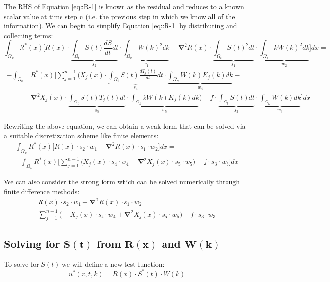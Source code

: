\documentclass{article}
\def\ds{\displaystyle}
\def\grad{\mathbf\nabla}
\begin{document}
The RHS of Equation \ref{eq::R-1} is known as the residual and reduces to a known scalar value at time step $n$ (i.e. the previous step in which we know all of the information). We can begin to simplify Equation \ref{eq::R-1} by distributing and collecting terms:
\begin{equation*}
\ds\int_{\Omega_x} R^*(x) \Bigg[ R(x)\cdot \underbrace{\ds\int_{\Omega_t} S(t)\frac{dS}{dt}dt}_{s_2} \cdot \underbrace{\ds\int_{\Omega_k} W(k)^2 dk}_{w_1} - \grad^2 R(x) \cdot \underbrace{\ds\int_{\Omega_t} S(t)^2 dt}_{s_1} \cdot \underbrace{\ds\int_{\Omega_k} kW(k)^2 dk}_{w_2} \Bigg] dx =
\end{equation*}\vspace{-15pt}
\begin{align}
-\ds\int_{\Omega_x}& R^*(x) \Bigg[ \ds\sum_{j=1}^{n-1} \bigg(X_j(x) \cdot \underbrace{\ds\int_{\Omega_t} S(t)\frac{dT_j(t)}{dt} dt}_{s_4} \cdot \underbrace{\ds\int_{\Omega_k}W(k)K_j(k) dk}_{w_4} - \nonumber \\
& \grad^2X_j(x) \cdot \underbrace{\ds\int_{\Omega_t}S(t)T_j(t) dt}_{s_5} \cdot \underbrace{\ds\int_{\Omega_k}kW(k)K_j(k)dk}_{w_5} \bigg) - f \cdot \underbrace{\ds\int_{\Omega_t} S(t) dt}_{s_3} \cdot \underbrace{\ds\int_{\Omega_k} W(k)dk}_{w_3} \Bigg] dx
\end{align}

Rewriting the above equation, we can obtain a weak form that can be solved via a suitable discretization scheme like finite elements:
\begin{gather}
\ds\int_{\Omega_x} R^*(x) \Bigg[ R(x)\cdot s_2 \cdot w_1 - \grad^2 R(x) \cdot s_1 \cdot w_2 \Bigg] dx = \nonumber \\
 -  \ds\int_{\Omega_x} R^*(x) \Bigg[ \ds\sum_{j=1}^{n-1} \bigg(X_j(x) \cdot s_4 \cdot w_4 - \grad^2X_j(x) \cdot s_5 \cdot w_5 \bigg) - f \cdot s_3 \cdot w_3 \Bigg] dx
\end{gather}

We can also consider the strong form which can be solved numerically through finite difference methods:
\begin{gather}
\label{eq::R-strong}
R(x)\cdot s_2 \cdot w_1 - \grad^2 R(x) \cdot s_1 \cdot w_2 =  \nonumber \\
\ds\sum_{j=1}^{n-1} \bigg(-X_j(x) \cdot s_4 \cdot w_4 + \grad^2X_j(x) \cdot s_5 \cdot w_5 \bigg) + f \cdot s_3 \cdot w_3
\end{gather}

\subsection{Solving for $\mathbf{S(t)}$ from $\mathbf{R(x)}$ and $\mathbf{W(k)}$}
To solve for $S(t)$ we will define a new test function:
\begin{equation}
\label{eq::R-TestFctn-2}
u^*(x,t,k) = R(x) \cdot S^*(t) \cdot W(k)
\end{equation}
\end{document}

